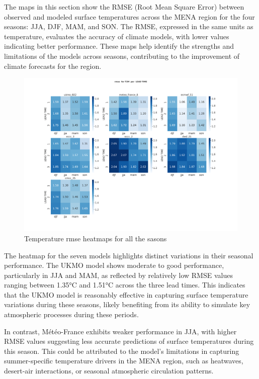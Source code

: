 The maps in this section show the RMSE (Root Mean Square Error) between observed and modeled surface temperatures across the MENA region for the four seasons: JJA, DJF, MAM, and SON. The RMSE, expressed in the same units as temperature, evaluates the accuracy of climate models, with lower values indicating better performance.  These maps help identify the strengths and limitations of the models across seasons, contributing to the improvement of climate forecasts for the region.
\begin{figure}[H]
    \centering
    \includegraphics[width=1\linewidth]{plots/det/rmse/rmse_T2M.png}
    \caption{Temperature rmse heatmaps for all the sasons}
    \label{fig:CORR_djf_t2m}
\end{figure}

The heatmap for the seven models highlights distinct variations in their seasonal performance. The UKMO model shows moderate to good performance, particularly in JJA and MAM, as reflected by relatively low RMSE values ranging between 1.35°C and 1.51°C across the three lead times. This indicates that the UKMO model is reasonably effective in capturing surface temperature variations during these seasons, likely benefiting from its ability to simulate key atmospheric processes during these periods.

In contrast, Météo-France exhibits weaker performance in JJA, with higher RMSE values suggesting less accurate predictions of surface temperatures during this season. This could be attributed to the model's limitations in capturing summer-specific temperature drivers in the MENA region, such as heatwaves, desert-air interactions, or seasonal atmospheric circulation patterns.

